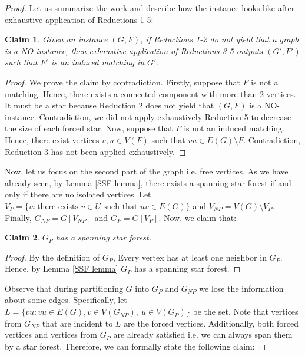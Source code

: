 \documentclass[en]{pracamgr}
\newtheorem{claim}{Claim}
\theoremstyle{definition}
\begin{document}
\begin{proof}
	Let us summarize the work and describe how the instance looks like after exhaustive application of Reductions 1-5:

	\begin{claim}
		Given an instance $(G,F)$, if Reductions 1-2 do not yield that a graph is a NO-instance, then exhaustive application of Reductions 3-5 outputs $(G',F')$ such that $F'$ is an induced matching in $G'$.
	\end{claim}
	
	\begin{proof}
		We prove the claim by contradiction. Firstly, suppose that $F$ is not a matching. Hence, there exists a connected component with more than $2$ vertices. It must be a star because Reduction 2 does not yield that $(G,F)$ is a NO-instance. Contradiction, we did not apply exhaustively Reduction 5 to decrease the size of each forced star. Now, suppose that $F$ is not an induced matching. Hence, there exist vertices $v,u \in V(F)$ such that $vu \in E(G) \setminus F$. Contradiction, Reduction 3 has not been applied exhaustively.
	\end{proof}

	Now, let us focus on the second part of the graph i.e. free vertices. As we have already seen, by Lemma \ref{SSF lemma}, there exists a spanning star forest if and only if there are no isolated vertices. Let $V_P = \{u: \text{there exists } v\in U \text{ such that }uv \in E(G)\}$ and $V_{NP} = V(G) \setminus V_P$. Finally, $G_{NP} = G[V_{NP}]$ and $G_P = G[V_P]$. Now, we claim that:

	\begin{claim}\label{GP partition}
		$G_P$ has a spanning star forest.
	\end{claim}
	
	\begin{proof}
		By the definition of $G_P$, Every vertex has at least one neighbor in $G_P$. Hence, by Lemma \ref{SSF lemma} $G_P$ has a spanning star forest.
	\end{proof}

	Observe that during partitioning $G$ into $G_P$ and $G_{NP}$ we lose the information about some edges. Specifically, let $L= \{vu: vu \in E(G), v \in V(G_{NP}),\ u \in V(G_P)\}$ be the set. Note that vertices from $G_{NP}$ that are incident to $L$ are the forced vertices. Additionally, both forced vertices and vertices from $G_P$ are already satisfied i.e. we can always span them by a star forest. Therefore, we can formally state the following claim:
	

\end{proof}
\end{document}
